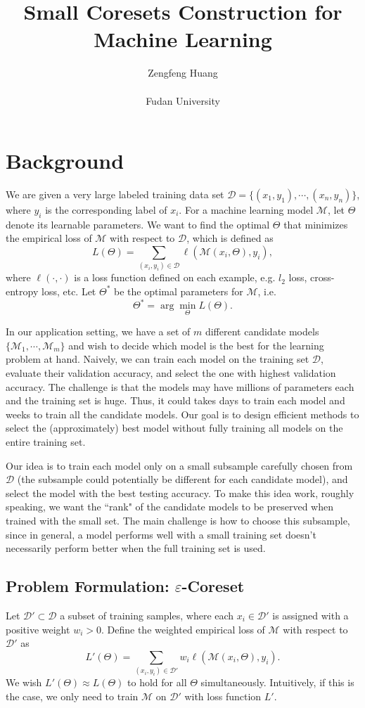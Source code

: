 \documentclass[12pt]{article}
\title{Small Coresets Construction for Machine Learning}
\author{Zengfeng Huang\\  \\ Fudan University}
\date{}
\newcommand{\eps}{\varepsilon}
\newcommand{\D}      {\mathcal{D}}
\newcommand{\M}      {\mathcal{M}}
\begin{document}
\maketitle
\section{Background}
We are given a very large labeled training data set $\mathcal{D} = \{(x_1,y_1),\cdots, (x_n,y_n)\}$, where $y_i$ is the corresponding label of $x_i$.  For a machine learning model $\mathcal{M}$, let $\Theta$ denote its learnable parameters.  We want to find the optimal $\Theta$ that minimizes the empirical loss of $\mathcal{M}$ with respect to $\D$, which is defined as 
\[
L (\Theta) = \sum_{(x_i,y_i) \in \D} \ell(\M(x_i, \Theta), y_i),
\]
where $\ell(\cdot,\cdot)$ is a loss function defined on each example, e.g. $l_2$ loss, cross-entropy loss, etc. Let $\Theta^*$ be the optimal parameters for $\M$, i.e.
\[
 \Theta^*= \arg\min_{\Theta} L (\Theta).
\]

In our application setting, we have a set of $m$ different candidate models $\{\mathcal{M}_1,\cdots, \mathcal{M}_m\}$ and wish to decide which model is the best for the learning problem at hand.  Naively, we can train each model on the training set $\D$, evaluate their validation accuracy, and select the one with highest validation accuracy.  The challenge is that the models may have millions of parameters each and the training set is huge. Thus, it could takes days to train each model and weeks to train all the candidate models.  Our goal is to design efficient methods to select the (approximately) best model without fully training all models on the entire training set. 

Our idea is to train each model only on a small subsample carefully chosen from $\D$ (the subsample could potentially be different for each candidate model), and select the model with the best testing accuracy. To make this idea work, roughly speaking, we want the ``rank" of the candidate models to be preserved when trained with the small set. 
The main challenge is how to choose this subsample, since in general, a model performs well with a small training set doesn't necessarily perform better when the full training set is used. 

\subsection{Problem Formulation: $\eps$-Coreset}
Let $\D' \subset \D$ a subset of training samples, where each $x_i\in \D'$ is assigned with a positive weight $w_i > 0$. Define the weighted empirical loss of $\mathcal{M}$ with respect to $\D'$ as
\[
 L'(\Theta) = \sum_{(x_i,y_i) \in \D'} w_i\ell(\M(x_i, \Theta), y_i).
\] 
We wish $ L'(\Theta) \approx L (\Theta)$ to hold for all $\Theta$ simultaneously. Intuitively, if this is the case,  we only need to train $\M$ on $\D'$ with loss function $L'$.
\end{document}
